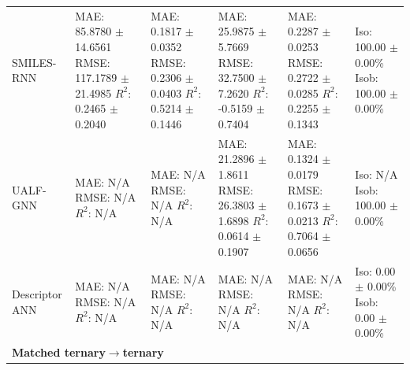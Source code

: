 \begin{tabular}{llllll}
SMILES-RNN & \shortstack[l]{MAE: 85.8780 $\pm$ 14.6561 \\ RMSE: 117.1789 $\pm$ 21.4985 \\ $R^2$: 0.2465 $\pm$ 0.2040} & \shortstack[l]{MAE: 0.1817 $\pm$ 0.0352 \\ RMSE: 0.2306 $\pm$ 0.0403 \\ $R^2$: 0.5214 $\pm$ 0.1446} & \shortstack[l]{MAE: 25.9875 $\pm$ 5.7669 \\ RMSE: 32.7500 $\pm$ 7.2620 \\ $R^2$: -0.5159 $\pm$ 0.7404} & \shortstack[l]{MAE: 0.2287 $\pm$ 0.0253 \\ RMSE: 0.2722 $\pm$ 0.0285 \\ $R^2$: 0.2255 $\pm$ 0.1343} & \shortstack[l]{Iso: 100.00 $\pm$ 0.00\% \\ Isob: 100.00 $\pm$ 0.00\%} \\
UALF-GNN & \shortstack[l]{MAE: N/A \\ RMSE: N/A \\ $R^2$: N/A} & \shortstack[l]{MAE: N/A \\ RMSE: N/A \\ $R^2$: N/A} & \shortstack[l]{MAE: 21.2896 $\pm$ 1.8611 \\ RMSE: 26.3803 $\pm$ 1.6898 \\ $R^2$: 0.0614 $\pm$ 0.1907} & \shortstack[l]{MAE: 0.1324 $\pm$ 0.0179 \\ RMSE: 0.1673 $\pm$ 0.0213 \\ $R^2$: 0.7064 $\pm$ 0.0656} & \shortstack[l]{Iso: N/A \\ Isob: 100.00 $\pm$ 0.00\%} \\
Descriptor ANN & \shortstack[l]{MAE: N/A \\ RMSE: N/A \\ $R^2$: N/A} & \shortstack[l]{MAE: N/A \\ RMSE: N/A \\ $R^2$: N/A} & \shortstack[l]{MAE: N/A \\ RMSE: N/A \\ $R^2$: N/A} & \shortstack[l]{MAE: N/A \\ RMSE: N/A \\ $R^2$: N/A} & \shortstack[l]{Iso: 0.00 $\pm$ 0.00\% \\ Isob: 0.00 $\pm$ 0.00\%} \\
\hline
\multicolumn{6}{l}{\textbf{Matched ternary$\to$ternary}} \\

\end{tabular}
